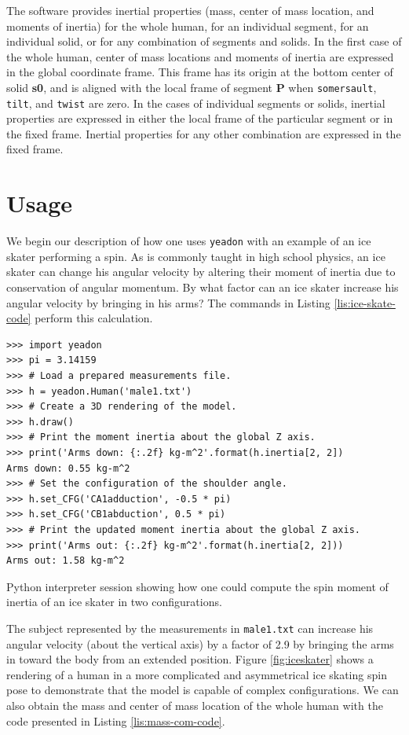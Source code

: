\documentclass[10pt,a4paper,twocolumn]{article}
\begin{document}
The software provides inertial properties (mass, center of mass location, and
moments of inertia) for the whole human, for an individual segment, for an
individual solid, or for any combination of segments and solids. In the first
case of the whole human, center of mass locations and moments of inertia are
expressed in the global coordinate frame. This frame has its origin at the
bottom center of solid \textbf{s0}, and is aligned with the local frame of
segment \textbf{P} when \verb+somersault+, \verb+tilt+, and \verb+twist+ are
zero. In the cases of individual segments or solids, inertial properties are
expressed in either the local frame of the particular segment or in the fixed
frame. Inertial properties for any other combination are expressed in the fixed
frame.

\section*{Usage}
\label{sec:usage}

We begin our description of how one uses \verb+yeadon+ with an example of an
ice skater performing a spin. As is commonly taught in high school physics, an
ice skater can change his angular velocity by altering their moment of inertia
due to conservation of angular momentum. By what factor can an ice skater
increase his angular velocity by bringing in his arms? The commands in Listing
\ref{lis:ice-skate-code} perform this calculation.

\begin{listing*}
  \begin{verbatim}
>>> import yeadon
>>> pi = 3.14159
>>> # Load a prepared measurements file.
>>> h = yeadon.Human('male1.txt')
>>> # Create a 3D rendering of the model.
>>> h.draw()
>>> # Print the moment inertia about the global Z axis.
>>> print('Arms down: {:.2f} kg-m^2'.format(h.inertia[2, 2])
Arms down: 0.55 kg-m^2
>>> # Set the configuration of the shoulder angle.
>>> h.set_CFG('CA1adduction', -0.5 * pi)
>>> h.set_CFG('CB1abduction', 0.5 * pi)
>>> # Print the updated moment inertia about the global Z axis.
>>> print('Arms out: {:.2f} kg-m^2'.format(h.inertia[2, 2]))
Arms out: 1.58 kg-m^2
  \end{verbatim}
  \caption{Python interpreter session showing how one could compute the spin
    moment of inertia of an ice skater in two configurations.}
  \label{lis:ice-skate-code}
\end{listing*}

The subject represented by the measurements in \verb+male1.txt+ can increase
his angular velocity (about the vertical axis) by a factor of 2.9 by bringing
the arms in toward the body from an extended position. Figure
\ref{fig:iceskater} shows a rendering of a human in a more complicated and
asymmetrical ice skating spin pose to demonstrate that the model is capable of
complex configurations. We can also obtain the mass and center of mass location
of the whole human with the code presented in Listing \ref{lis:mass-com-code}.
\end{document}
